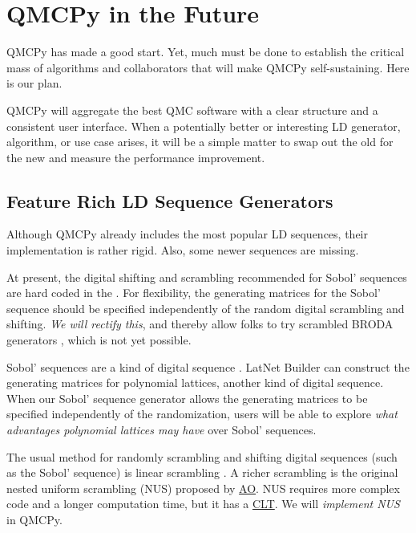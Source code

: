 \documentclass[11pt]{NSFamsart}
\newcommand{\AO}{\hyperlink{AOlink}{AO}\xspace}
\newcommand{\CLT}{\hyperlink{CLTlink}{CLT}\xspace}
\begin{document}
\section{QMCPy in the Future}
QMCPy has made a good start.  Yet, much must be done to establish the critical mass of algorithms and collaborators that will make QMCPy  self-sustaining.  Here is our plan.

QMCPy will aggregate the best QMC software with a clear structure and a consistent user interface.  When a potentially better or interesting LD generator, algorithm, or use case arises, it will be a simple matter to swap out the old for the new and measure the performance improvement.

\subsection{Feature Rich LD Sequence Generators} \label{sec:richLD}
Although QMCPy already includes the most popular LD sequences, their implementation is rather rigid.  Also, some newer sequences are missing.

At present, the digital shifting and scrambling recommended for Sobol' sequences are hard coded in the  .  For flexibility, the generating matrices  for the Sobol' sequence should be specified independently of the random digital scrambling and shifting.  \emph{We will rectify this}, and thereby allow folks to try scrambled BRODA generators \cite{BRODA20a}, which is not yet possible.

Sobol' sequences are a kind of digital sequence \cite{DicPil10a}.  LatNet Builder \cite{LatNet} can construct the generating matrices for polynomial lattices,  another kind of digital sequence.  When our Sobol' sequence generator allows the  generating matrices to be specified independently of the randomization, users will be able to explore  \emph{what advantages polynomial lattices may have} over Sobol' sequences.

The usual method for randomly scrambling and shifting digital sequences (such as the Sobol' sequence) is linear scrambling \cite{Mat98,HonHic00a}.  A richer scrambling is the original nested uniform scrambling (NUS) proposed by \AO \cite{Owe95}.  NUS requires more complex code and a longer computation time, but it has a \CLT  \cite{Loh01}.  We will \emph{implement NUS} in QMCPy.
\end{document}
